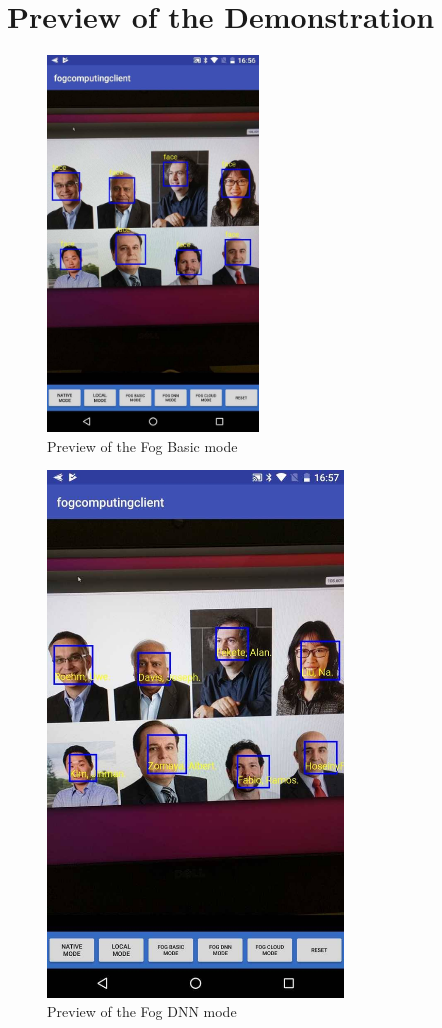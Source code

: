 \chapter{Preview of the Demonstration}

\begin{figure}
    \centering
    \includegraphics[width=0.5\textwidth]{images/fog_basic_preview.jpg}
    \caption{Preview of the Fog Basic mode}
    \label{fig:preview_fog_basic}
\end{figure}

\begin{figure}
    \centering
    \includegraphics[width=0.7\textwidth]{images/fog_dnn_preview.jpg}
    \caption{Preview of the Fog DNN mode}
    \label{fig:preview_fog_dnn}
\end{figure}
